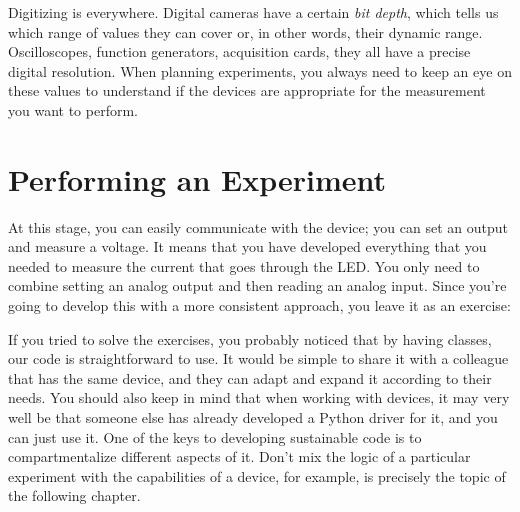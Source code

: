 Digitizing is everywhere. Digital cameras have a certain \emph{bit depth}, which tells us which range of values they can cover or, in other words, their dynamic range. Oscilloscopes, function generators, acquisition cards, they all have a precise digital resolution. When planning experiments, you always need to keep an eye on these values to understand if the devices are appropriate for the measurement you want to perform.


\section{Performing an Experiment}\label{sec:doing-an-experiment}
At this stage, you can easily communicate with the device; you can set an output and measure a voltage. It means that you have developed everything that you needed to measure the current that goes through the LED. You only need to combine setting an analog output and then reading an analog input. Since you're going to develop this with a more consistent approach, you leave it as an exercise:




If you tried to solve the exercises, you probably noticed that by having classes, our code is straightforward to use. It would be simple to share it with a colleague that has the same device, and they can adapt and expand it according to their needs. You should also keep in mind that when working with devices, it may very well be that someone else has already developed a Python driver for it, and you can just use it. One of the keys to developing sustainable code is to compartmentalize different aspects of it. Don't mix the logic of a particular experiment with the capabilities of a device, for example, is precisely the topic of the following chapter.

